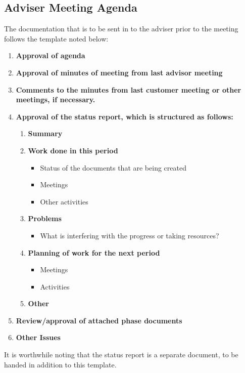 \documentclass[../document]{subfiles}
\begin{document}
\subsection{Adviser Meeting Agenda}
\label{adviser_meeting_agenda}
The documentation that is to be sent in to the adviser prior to the meeting follows the template noted below:

\begin{enumerate}
	\item
	\textbf{Approval of agenda}
	\item
	\textbf{Approval of minutes of meeting from last advisor meeting}
	\item
	\textbf{Comments to the minutes from last customer meeting or other meetings, if necessary.}
	\item
	\textbf{Approval of the status report, which is structured as follows:}
	\begin{enumerate}[label*=\arabic*.]
		\item
		\textbf{Summary}
		\item
		\textbf{Work done in this period}
		\begin{itemize}
			\item
			Status of the documents that are being created
			\item
			Meetings
			\item
			Other activities
		\end{itemize}
		\item
		\textbf{Problems}
		\begin{itemize}
			\item
			What is interfering with the progress or taking resources?
		\end{itemize}
		\item
		\textbf{Planning of work for the next period}
		\begin{itemize}
			\item
			Meetings
			\item
			Activities
		\end{itemize}
		\item
		\textbf{Other}
	\end{enumerate}
	\item
	\textbf{Review/approval of attached phase documents}
	\item
	\textbf{Other Issues}
\end{enumerate}

It is worthwhile noting that the status report is a separate document, to be handed in addition to this template.
\end{document}
